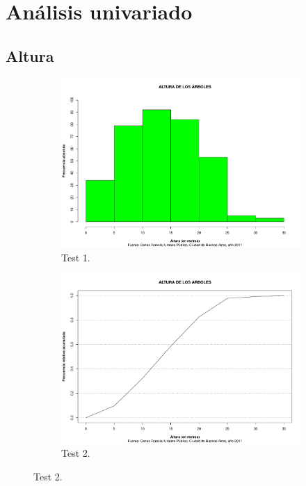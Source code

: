 \documentclass{article}
\begin{document}
\newpage

\section{Análisis univariado}

\subsection{Altura}

\begin{figure}[h!]
  \centering
  \begin{subfigure}[b]{0.9\linewidth}
    \includegraphics[width=\linewidth]{histAltura.pdf}
    \caption{Test 1.}
    \label{fig:histAltura}
  \end{subfigure}
  \begin{subfigure}[b]{0.9\linewidth}
    \includegraphics[width=\linewidth]{acumAltura.pdf}
    \caption{Test 2.}
    \label{fig:acumAltura}
  \end{subfigure}  
\end{figure}
\end{document}
